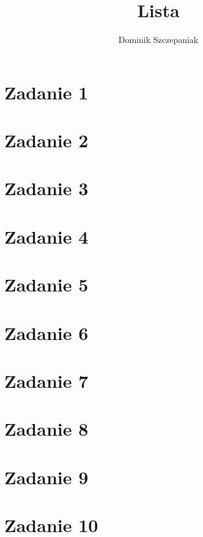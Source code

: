 \documentclass[12pt]{article}
\title{Lista }
\author{Dominik Szczepaniak}
\begin{document}
\maketitle
\bgroup\obeylines

\section{Zadanie 1}

\section{Zadanie 2}

\section{Zadanie 3}

\section{Zadanie 4}

\section{Zadanie 5}

\section{Zadanie 6}

\section{Zadanie 7}

\section{Zadanie 8}

\section{Zadanie 9}

\section{Zadanie 10}

\egroup
\end{document}
